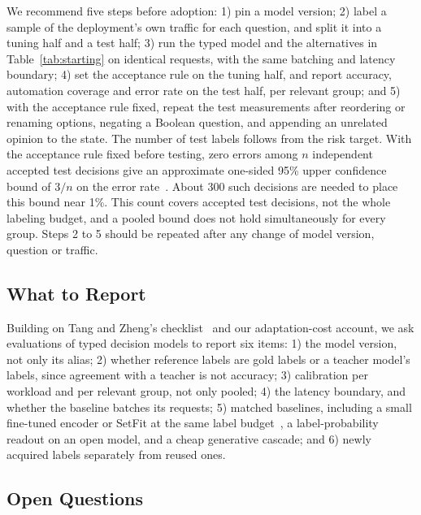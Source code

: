 We recommend five steps before adoption: 1) pin a model version; 2) label a sample of the deployment's own traffic for each question, and split it into a tuning half and a test half; 3) run the typed model and the alternatives in Table~\ref{tab:starting} on identical requests, with the same batching and latency boundary; 4) set the acceptance rule on the tuning half, and report accuracy, automation coverage and error rate on the test half, per relevant group; and 5) with the acceptance rule fixed, repeat the test measurements after reordering or renaming options, negating a Boolean question, and appending an unrelated opinion to the state. The number of test labels follows from the risk target. With the acceptance rule fixed before testing, zero errors among $n$ independent accepted test decisions give an approximate one-sided 95\% upper confidence bound of $3/n$ on the error rate~\cite{hanley1983nothing}. About 300 such decisions are needed to place this bound near 1\%. This count covers accepted test decisions, not the whole labeling budget, and a pooled bound does not hold simultaneously for every group. Steps 2 to 5 should be repeated after any change of model version, question or traffic.

\subsection{What to Report}

Building on Tang and Zheng's checklist~\cite{tang2026typed} and our adaptation-cost account, we ask evaluations of typed decision models to report six items: 1) the model version, not only its alias; 2) whether reference labels are gold labels or a teacher model's labels, since agreement with a teacher is not accuracy; 3) calibration per workload and per relevant group, not only pooled; 4) the latency boundary, and whether the baseline batches its requests; 5) matched baselines, including a small fine-tuned encoder or SetFit at the same label budget~\cite{tunstall2022efficient}, a label-probability readout on an open model, and a cheap generative cascade; and 6) newly acquired labels separately from reused ones.

\subsection{Open Questions}
\label{sec:open}

